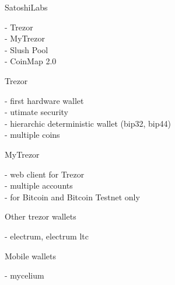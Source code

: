 \documentclass{beamer}
\begin{document}
\begin{frame}

    {\LARGE SatoshiLabs}\\

    \vspace{5mm}

    - Trezor\\
    - MyTrezor\\
    - Slush Pool\\
    - CoinMap 2.0\\

\end{frame}

\begin{frame}

    {\LARGE Trezor}\\

    \vspace{5mm}

    - first hardware wallet\\
    - utimate security\\
    - hierarchic deterministic wallet (bip32, bip44)\\
    - multiple coins\\


\end{frame}

\begin{frame}

    {\LARGE MyTrezor}\\

    \vspace{5mm}

    - web client for Trezor\\
    - multiple accounts\\
    - for Bitcoin and Bitcoin Testnet only\\


\end{frame}

\begin{frame}

    {\LARGE Other trezor wallets}\\

    \vspace{5mm}

    - electrum, electrum ltc\\

    \vspace{10mm}

    {\LARGE Mobile wallets}\\

    \vspace{5mm}

    - mycelium\\

\end{frame}
\end{document}
